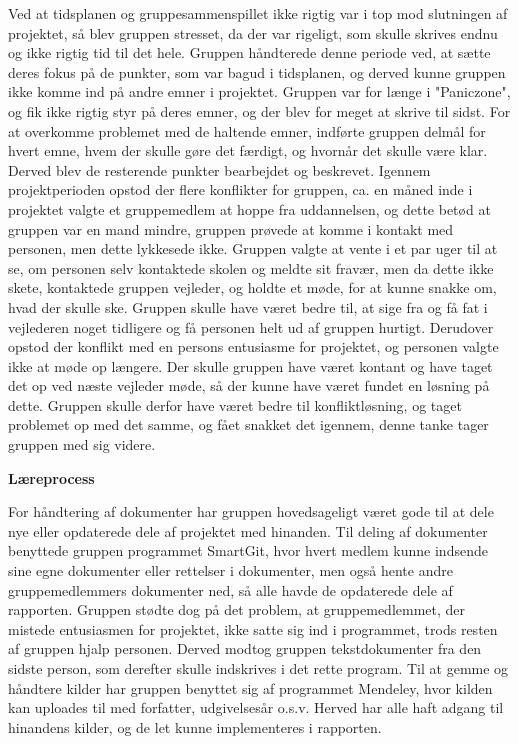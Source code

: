 Ved at tidsplanen og gruppesammenspillet ikke rigtig var i top mod slutningen af projektet, så blev gruppen stresset, da der var rigeligt, som skulle skrives endnu og ikke rigtig tid til det hele. Gruppen håndterede denne periode ved, at sætte deres fokus på de punkter, som var bagud i tidsplanen, og derved kunne gruppen ikke komme ind på andre emner i projektet. Gruppen var for længe i "Paniczone", og fik ikke rigtig styr på deres emner, og der blev for meget at skrive til sidst. For at overkomme problemet med de haltende emner, indførte gruppen delmål for hvert emne, hvem der skulle gøre det færdigt, og hvornår det skulle være klar. Derved blev de resterende punkter bearbejdet og beskrevet. Igennem projektperioden opstod der flere konflikter for gruppen, ca. en måned inde i projektet valgte et gruppemedlem at hoppe fra uddannelsen, og dette betød at gruppen var en mand mindre, gruppen prøvede at komme i kontakt med personen, men dette lykkesede ikke. Gruppen valgte at vente i et par uger til at se, om personen selv kontaktede skolen og meldte sit fravær, men da dette ikke skete, kontaktede gruppen vejleder, og holdte et møde, for at kunne snakke om, hvad der skulle ske. Gruppen skulle have været bedre til, at sige fra og få fat i vejlederen noget tidligere og få personen helt ud af gruppen hurtigt. Derudover opstod der konflikt med en persons entusiasme for projektet, og personen valgte ikke at møde op længere. Der skulle gruppen have været kontant og have taget det op ved næste vejleder møde, så der kunne have været fundet en løsning på dette. Gruppen skulle derfor have været bedre til konfliktløsning, og taget problemet op med det samme, og fået snakket det igennem, denne tanke tager gruppen med sig videre. 

\textbf{Læreprocess}

For håndtering af dokumenter har gruppen hovedsageligt været gode til at dele nye eller opdaterede dele af projektet med hinanden. Til deling af dokumenter benyttede gruppen programmet SmartGit, hvor hvert medlem kunne indsende sine egne dokumenter eller rettelser i dokumenter, men også hente andre gruppemedlemmers dokumenter ned, så alle havde de opdaterede dele af rapporten. Gruppen stødte dog på det problem, at gruppemedlemmet, der mistede entusiasmen for projektet, ikke satte sig ind i programmet, trods resten af gruppen hjalp personen. Derved modtog gruppen tekstdokumenter fra den sidste person, som derefter skulle indskrives i det rette program. Til at gemme og håndtere kilder har gruppen benyttet sig af programmet Mendeley, hvor kilden kan uploades til med forfatter, udgivelsesår o.s.v. Herved har alle haft adgang til hinandens kilder, og de let kunne implementeres i rapporten.

